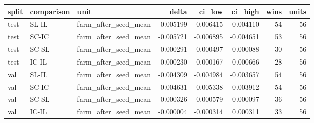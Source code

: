 \begin{tabular}{lllrrrrr}
\toprule
split & comparison & unit & delta & ci\_low & ci\_high & wins & units \\
\midrule
test & SL-IL & farm\_after\_seed\_mean & -0.005199 & -0.006415 & -0.004110 & 54 & 56 \\
test & SC-IC & farm\_after\_seed\_mean & -0.005721 & -0.006895 & -0.004651 & 53 & 56 \\
test & SC-SL & farm\_after\_seed\_mean & -0.000291 & -0.000497 & -0.000088 & 30 & 56 \\
test & IC-IL & farm\_after\_seed\_mean & 0.000230 & -0.000167 & 0.000666 & 28 & 56 \\
val & SL-IL & farm\_after\_seed\_mean & -0.004309 & -0.004984 & -0.003657 & 54 & 56 \\
val & SC-IC & farm\_after\_seed\_mean & -0.004631 & -0.005338 & -0.003912 & 54 & 56 \\
val & SC-SL & farm\_after\_seed\_mean & -0.000326 & -0.000579 & -0.000097 & 36 & 56 \\
val & IC-IL & farm\_after\_seed\_mean & -0.000004 & -0.000314 & 0.000311 & 33 & 56 \\
\bottomrule
\end{tabular}
